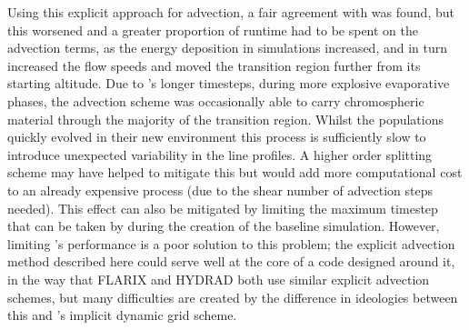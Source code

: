 Using this explicit approach for advection, a fair agreement with \Radyn{} was found, but this worsened and a greater proportion of runtime had to be spent on the advection terms, as the energy deposition in simulations increased, and in turn increased the flow speeds and moved the transition region further from its starting altitude.
Due to \Radyn{}'s longer timesteps, during more explosive evaporative phases, the advection scheme was occasionally able to carry chromospheric material through the majority of the transition region.
Whilst the populations quickly evolved in their new environment this process is sufficiently slow to introduce unexpected variability in the line profiles.
A higher order splitting scheme may have helped to mitigate this but would add more computational cost to an already expensive process (due to the shear number of advection steps needed).
This effect can also be mitigated by limiting the maximum timestep that can be taken by \Radyn{} during the creation of the baseline simulation.
However, limiting \Radyn{}'s performance is a poor solution to this problem; the explicit advection method described here could serve well at the core of a code designed around it, in the way that FLARIX and HYDRAD both use similar explicit advection schemes, but many difficulties are created by the difference in ideologies between this and \Radyn{}'s implicit dynamic grid scheme.

